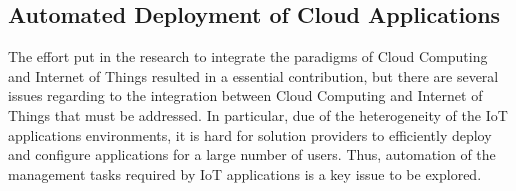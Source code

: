 \subsection{Automated Deployment of Cloud Applications}
\label{sub:Automated Deployment of IoT Applications}
The effort put in the research to integrate the paradigms of Cloud Computing and Internet
of Things resulted in a essential contribution, but there are several issues regarding to the
integration between Cloud Computing and Internet of Things that must be addressed. In particular,
due of the heterogeneity of the IoT applications environments, it is hard for solution providers
to efficiently deploy and configure applications for a large number of users. Thus, automation of
the management tasks required by IoT applications is a key issue to be explored.\\

